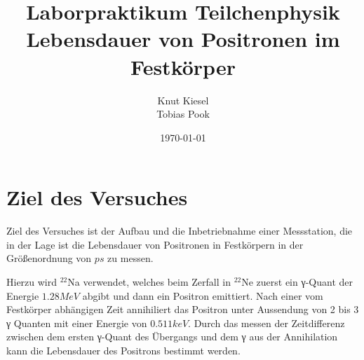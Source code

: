 \documentclass[a4paper,12pt]{article}
\title{Laborpraktikum Teilchenphysik\\ Lebensdauer von Positronen im Festkörper}
\author{Knut Kiesel\\Tobias Pook}
\date{\today}
\begin{document}
\maketitle
\vspace{5cm}
\tableofcontents
\thispagestyle{empty}
\newpage
\setcounter{page}{1}

\section{Ziel des Versuches}
Ziel des Versuches ist der Aufbau und die Inbetriebnahme einer Messstation,
die in der Lage ist die Lebensdauer von Positronen in Festkörpern in der
Größenordnung von $\si{ps}$ zu messen.

Hierzu wird $^{22}$Na verwendet, welches beim Zerfall in $^{22}$Ne
zuerst ein γ-Quant der Energie $1.28\si{MeV}$ abgibt und dann ein Positron emittiert.
Nach einer vom Festkörper abhängigen Zeit annihiliert das Positron unter Aussendung
von 2 bis 3 γ Quanten mit einer Energie von $0.511\si{keV}$.
Durch das messen der Zeitdifferenz zwischen dem ersten γ-Quant des Übergangs und dem
γ aus der Annihilation kann die Lebensdauer des Positrons bestimmt werden.
\end{document}

